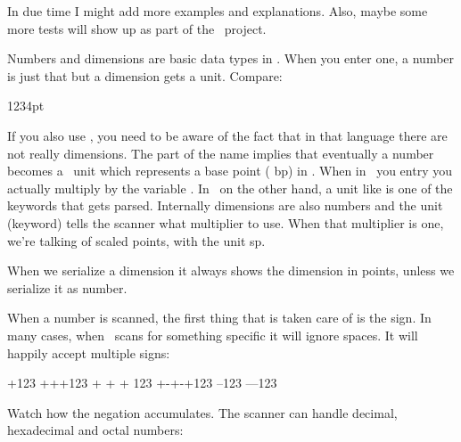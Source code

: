 In due time I might add more examples and explanations. Also, maybe some more
tests will show up as part of the \LUAMETATEX\ project.

\stopsectionlevel

\startsectionlevel[title={Number and dimensions}]

Numbers and dimensions are basic data types in \TEX. When you enter one, a number
is just that but a dimension gets a unit. Compare:

1234pt
\stoptyping

If you also use \METAPOST, you need to be aware of the fact that in that language
there are not really dimensions. The  part of the name implies that
eventually a number becomes a \POSTSCRIPT\ unit which represents a base point (\type
{bp}) in \TEX. When in \METAPOST\ you entry \type {1234pt} you actually multiply
 by the variable . In \TEX\ on the other hand, a unit like
 is one of the keywords that gets parsed. Internally dimensions are
also numbers and the unit (keyword) tells the scanner what multiplier to use.
When that multiplier is one, we're talking of scaled points, with the unit \type
{sp}.

\startbuffer
\the\dimexpr 12.34pt \relax
\the\dimexpr 12.34sp \relax
\the\dimexpr 12.99sp \relax
\the\dimexpr 1234sp  \relax
\the{}    \relax
\stopbuffer

\typebuffer[option=TEX]

\startlines \getbuffer \stoplines

When we serialize a dimension it always shows the dimension in points, unless we
serialize it as number.

\startbuffer
{}
\number\scratchdimen
\the\scratchdimen
\stopbuffer

\typebuffer[option=TEX]

\startlines \getbuffer \stoplines

When a number is scanned, the first thing that is taken care of is the sign. In many
cases, when \TEX\ scans for something specific it will ignore spaces. It will
happily accept multiple signs:

\startbuffer
\number +123
\number +++123
\number + + + 123
\number +-+-+123
\number --123
\number ---123
\stopbuffer

\typebuffer[option=TEX]

\startlines \getbuffer \stoplines

Watch how the negation accumulates. The scanner can handle decimal, hexadecimal
and octal numbers:


